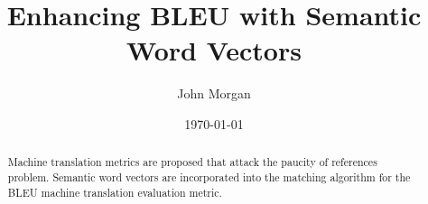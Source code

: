 \documentclass{article}
\title{Enhancing BLEU  with Semantic Word Vectors}
\author{John Morgan}
\date{\today}
\begin{document}
\maketitle
\begin{abstract}
Machine translation metrics are proposed that attack the paucity of references problem. 
Semantic word vectors are incorporated into the matching algorithm for the BLEU machine translation evaluation metric. 

\end{abstract}
\tableofcontents





\newpage



\end{document}
